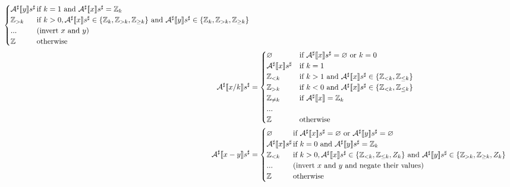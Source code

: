 \begin{exercise}
\begin{align*}
\begin{cases}
            \Asharp{y} s^\sharp \hspace*{-0.3cm} & \text{if } k = 1 \text{ and } \Asharp{x} s^\sharp = \Z_k \\
            \Z_{>k} & \text{if } k > 0, \Asharp{x} s^\sharp \in \{ \Z_k, \Z_{>k}, \Z_{\geq k} \} \text{ and } \Asharp{y} s^\sharp \in \{ \Z_k, \Z_{>k}, \Z_{\geq k} \} \\
            ... & \text{(invert $x$ and $y$)} \\
            \Z & \text{otherwise}
        \end{cases} \\
        \Asharp{x / k} s^\sharp &= \begin{cases}
            \varnothing & \text{if } \Asharp{x} s^\sharp = \varnothing \text{ or } k = 0 \\
            \Asharp{x} s^\sharp & \text{if } k = 1 \\
            \Z_{< k} & \text{if } k > 1 \text{ and } \Asharp{x} s^\sharp \in \{ \Z_{< k}, \Z_{\leq k} \} \\
            \Z_{> k} & \text{if } k < 0 \text{ and } \Asharp{x} s^\sharp \in \{ \Z_{< k}, \Z_{\leq k} \} \\
            \Z_{\neq k} & \text{if } \Asharp{x} = \Z_k \\
            ... \\
            \Z & \text{otherwise}
        \end{cases} \\
        \Asharp{x - y} s^\sharp &= \begin{cases}
            \varnothing & \text{if } \Asharp{x} s^\sharp = \varnothing \text{ or } \Asharp{y} s^\sharp = \varnothing \\
            \Asharp{x} s^\sharp \hspace*{-0.3cm} & \text{if } k = 0 \text{ and } \Asharp{y} s^\sharp = \Z_k \\
            \Z_{< k} & \text{if } k > 0, \Asharp{x} s^\sharp \in \{ \Z_{< k}, \Z_{\leq k}, Z_k \} \text{ and } \Asharp{y} s^\sharp \in \{ \Z_{> k}, \Z_{\geq k}, Z_k \} \\
            ... & \text{(invert $x$ and $y$ and negate their values)} \\
            \Z & \text{otherwise}
        \end{cases} \\
    \end{align*}
\end{exercise}
